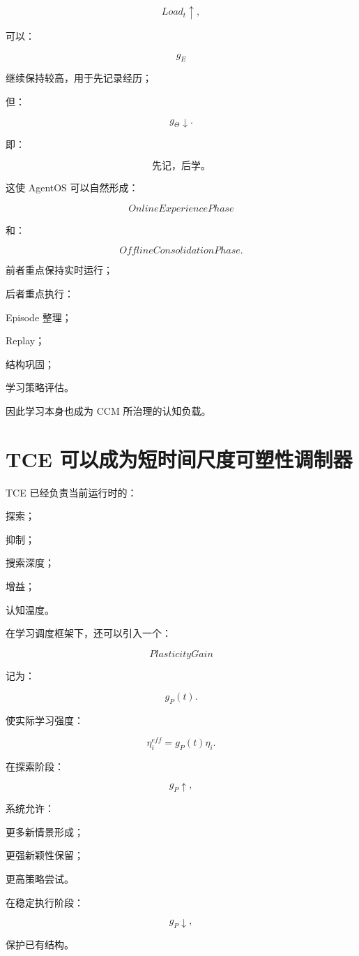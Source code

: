 \[
Load_t\uparrow,
\]

可以：

\[
g_E
\]

继续保持较高，用于先记录经历；

但：

\[
g_\Theta\downarrow.
\]

即：

\[
\boxed{
\text{先记，后学。}
}
\]

这使 AgentOS 可以自然形成：

\[
\boxed{
OnlineExperiencePhase
}
\]

和：

\[
\boxed{
OfflineConsolidationPhase.
}
\]

前者重点保持实时运行；

后者重点执行：

Episode 整理；

Replay；

结构巩固；

学习策略评估。

因此学习本身也成为 CCM 所治理的认知负载。


\section{TCE 可以成为短时间尺度可塑性调制器}

TCE 已经负责当前运行时的：

探索；

抑制；

搜索深度；

增益；

认知温度。

在学习调度框架下，还可以引入一个：

\[
\boxed{
PlasticityGain
}
\]

记为：

\[
g_P(t).
\]

使实际学习强度：

\[
\boxed{
\eta_i^{eff}
=
g_P(t)\eta_i.
}
\]

在探索阶段：

\[
g_P\uparrow,
\]

系统允许：

更多新情景形成；

更强新颖性保留；

更高策略尝试。

在稳定执行阶段：

\[
g_P\downarrow,
\]

保护已有结构。

